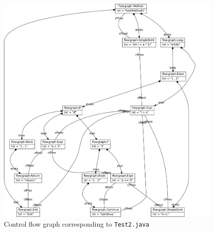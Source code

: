 \documentclass[10pt]{article}
\begin{document}
\begin{figure}[h!]
  \centering
  \includegraphics[width=\linewidth]{../results/Test2-ControlFlowGraph}
  \caption{Control flow graph corresponding to \texttt{Test2.java}}
  \label{fig:cfg-test2}
\end{figure}
\end{document}
